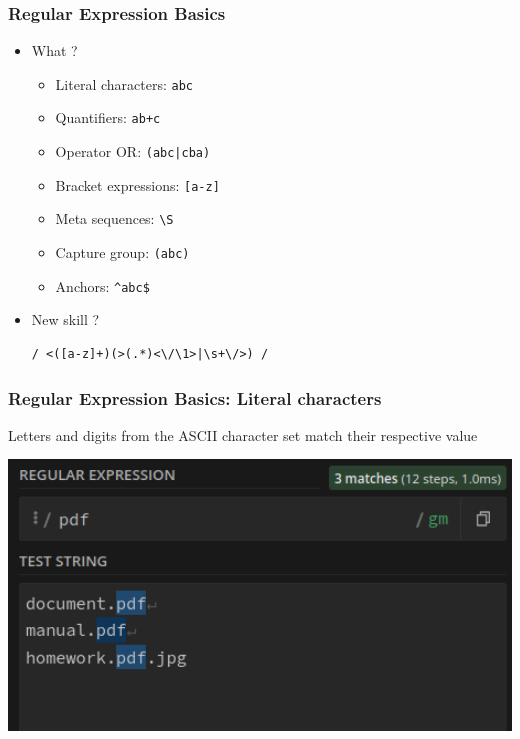 \documentclass{beamer}
\begin{document}
\begin{frame}[fragile]
    \frametitle{Regular Expression Basics}
    \begin{itemize}
        \item What ?
        \begin{itemize}
            \item Literal characters: \texttt{abc}
            \item Quantifiers: \texttt{ab+c}
            \item Operator OR: \texttt{(abc|cba)}
            \item Bracket expressions: \texttt{[a-z]}
            \item Meta sequences: \texttt{\textbackslash S}
            \item Capture group: \texttt{(abc)}
            \item Anchors: \texttt{\textasciicircum abc\$}
        \end{itemize}
        \item New skill ?
        \vspace{1em}
        \begin{verbatim}/ <([a-z]+)(>(.*)<\/\1>|\s+\/>) /\end{verbatim}
    \end{itemize}
\end{frame}

\begin{frame}[fragile]
    \frametitle{Regular Expression Basics: Literal characters}
    \begin{center}
        Letters and digits from the ASCII character set match their respective value
    \end{center}
    \begin{center}
    \includegraphics[width=1.0\textwidth]{pics/regex/regex1.png}
    \end{center}
\end{frame}
\end{document}
